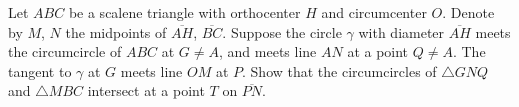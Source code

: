 Let $ABC$ be a scalene triangle with orthocenter $H$ and circumcenter $O$. Denote by $M$, $N$ the midpoints of $\overline{AH}$, $\overline{BC}$. Suppose the circle $\gamma$ with diameter $\overline{AH}$ meets the circumcircle of $ABC$ at $G \neq A$, and meets line $AN$ at a point $Q \neq A$.  The tangent to $\gamma$ at $G$ meets line $OM$ at $P$. Show that the circumcircles of $\triangle GNQ$ and $\triangle MBC$ intersect at a point $T$ on $\overline{PN}$.